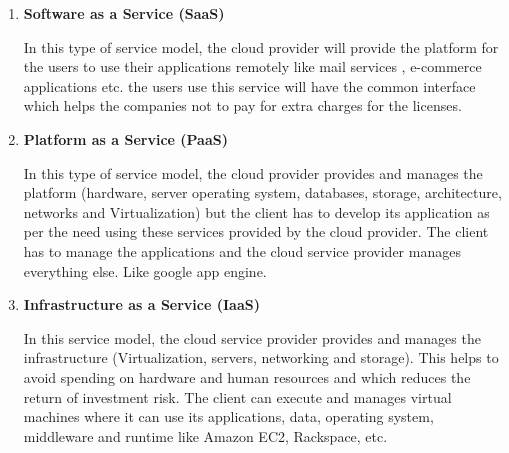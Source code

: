     \par
    \begin{enumerate}
        \item \textbf{Software as a Service (SaaS)\cite{deploy}}
        \par
            In this type of service model, the cloud provider will provide the platform for the users to use their applications remotely like mail services , e-commerce applications etc. the users use this service will have the common interface which helps the companies not to pay for extra charges for the licenses.%
        
        \item \textbf{Platform as a Service (PaaS)\cite{deploy}}
        \par
            In this type of service model, the cloud provider provides and manages the platform (hardware, server operating system, databases, storage, architecture, networks and Virtualization) but the client has to develop its application as per the need using these services provided by the cloud provider. The client has to manage the applications and the cloud service provider manages everything else. Like google app engine.%
        
        \item \textbf{Infrastructure as a Service (IaaS)\cite{deploy}}
        \par
            In this service model, the cloud service provider provides and manages the infrastructure (Virtualization, servers, networking and storage). This helps to avoid spending on hardware and human resources and which reduces the return of investment risk. The client can execute and manages virtual machines where it can use its applications, data, operating system, middleware and runtime like Amazon EC2, Rackspace, etc.
    \end{enumerate}
    
